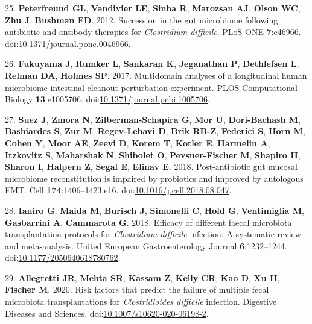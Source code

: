 \documentclass[11pt,]{article}
\newlength{\cslhangindent}
\newenvironment{cslreferences}%
  {\setlength{\parindent}{0pt}%
  \everypar{\setlength{\hangindent}{\cslhangindent}}\ignorespaces}%
  {\par}
\begin{document}
\begin{cslreferences}
\leavevmode\hypertarget{ref-peterfreund2012}{}%
25. \textbf{Peterfreund GL}, \textbf{Vandivier LE}, \textbf{Sinha R},
\textbf{Marozsan AJ}, \textbf{Olson WC}, \textbf{Zhu J}, \textbf{Bushman
FD}. 2012. Succession in the gut microbiome following antibiotic and
antibody therapies for \emph{Clostridium difficile}. PLoS ONE
\textbf{7}:e46966.
doi:\href{https://doi.org/10.1371/journal.pone.0046966}{10.1371/journal.pone.0046966}.

\leavevmode\hypertarget{ref-fukuyama2017}{}%
26. \textbf{Fukuyama J}, \textbf{Rumker L}, \textbf{Sankaran K},
\textbf{Jeganathan P}, \textbf{Dethlefsen L}, \textbf{Relman DA},
\textbf{Holmes SP}. 2017. Multidomain analyses of a longitudinal human
microbiome intestinal cleanout perturbation experiment. PLOS
Computational Biology \textbf{13}:e1005706.
doi:\href{https://doi.org/10.1371/journal.pcbi.1005706}{10.1371/journal.pcbi.1005706}.

\leavevmode\hypertarget{ref-suez2018}{}%
27. \textbf{Suez J}, \textbf{Zmora N}, \textbf{Zilberman-Schapira G},
\textbf{Mor U}, \textbf{Dori-Bachash M}, \textbf{Bashiardes S},
\textbf{Zur M}, \textbf{Regev-Lehavi D}, \textbf{Brik RB-Z},
\textbf{Federici S}, \textbf{Horn M}, \textbf{Cohen Y}, \textbf{Moor
AE}, \textbf{Zeevi D}, \textbf{Korem T}, \textbf{Kotler E},
\textbf{Harmelin A}, \textbf{Itzkovitz S}, \textbf{Maharshak N},
\textbf{Shibolet O}, \textbf{Pevsner-Fischer M}, \textbf{Shapiro H},
\textbf{Sharon I}, \textbf{Halpern Z}, \textbf{Segal E}, \textbf{Elinav
E}. 2018. Post-antibiotic gut mucosal microbiome reconstitution is
impaired by probiotics and improved by autologous FMT. Cell
\textbf{174}:1406--1423.e16.
doi:\href{https://doi.org/10.1016/j.cell.2018.08.047}{10.1016/j.cell.2018.08.047}.

\leavevmode\hypertarget{ref-ianiro2018}{}%
28. \textbf{Ianiro G}, \textbf{Maida M}, \textbf{Burisch J},
\textbf{Simonelli C}, \textbf{Hold G}, \textbf{Ventimiglia M},
\textbf{Gasbarrini A}, \textbf{Cammarota G}. 2018. Efficacy of different
faecal microbiota transplantation protocols for \emph{Clostridium
difficile} infection: A systematic review and meta-analysis. United
European Gastroenterology Journal \textbf{6}:1232--1244.
doi:\href{https://doi.org/10.1177/2050640618780762}{10.1177/2050640618780762}.

\leavevmode\hypertarget{ref-allegretti2020}{}%
29. \textbf{Allegretti JR}, \textbf{Mehta SR}, \textbf{Kassam Z},
\textbf{Kelly CR}, \textbf{Kao D}, \textbf{Xu H}, \textbf{Fischer M}.
2020. Risk factors that predict the failure of multiple fecal microbiota
transplantations for \emph{Clostridioides difficile} infection.
Digestive Diseases and Sciences.
doi:\href{https://doi.org/10.1007/s10620-020-06198-2}{10.1007/s10620-020-06198-2}.


\end{cslreferences}
\end{document}

